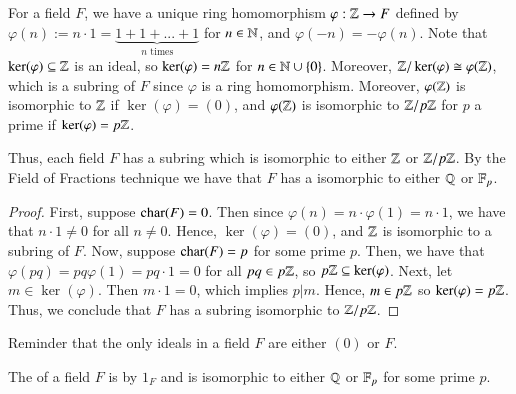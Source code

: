 \begin{rmk}
    For a field $F$, we have a unique ring homomorphism $\varphi:\mathbb Z\rightarrow F$ defined by $\varphi(n) := n\cdot 1 = \underbrace{1+1+...+1}_{\text{$n$ times}}$ for $n \in \mathbb N$, and $\varphi(-n) = -\varphi(n)$. Note that $\ker(\varphi) \subseteq \mathbb Z$ is an ideal, so $\ker(\varphi) = n\mathbb Z$ for $n \in \mathbb N\cup \{0\}$. Moreover, $\mathbb Z/\ker(\varphi) \cong \varphi(\mathbb Z)$, which is a subring of $F$ since $\varphi$ is a ring homomorphism. Moreover, $\varphi(\mathbb Z)$ is isomorphic to $\mathbb Z$ if $\ker(\varphi) = (0)$, and $\varphi(\mathbb Z)$ is isomorphic to $\mathbb Z/p\mathbb Z$ for $p$ a prime if $\ker(\varphi) = p\mathbb Z$. 

    Thus, each field $F$ has a subring which is isomorphic to either $\mathbb Z$ or $\mathbb Z/p\mathbb Z$. By the Field of Fractions technique we have that $F$ has a  isomorphic to either $\mathbb Q$ or $\mathbb F_p$.
\end{rmk}
\begin{proof}
    First, suppose $\operatorname{char}(F) = 0$. Then since $\varphi(n) = n\cdot \varphi(1) = n\cdot 1$, we have that $n\cdot 1 \neq 0$ for all $n \neq 0$. Hence, $\ker(\varphi) = (0)$, and $\mathbb Z$ is isomorphic to a subring of $F$. Now, suppose $\operatorname{char}(F) = p$ for some prime $p$. Then, we have that $\varphi(pq) = pq\varphi(1) = pq\cdot1 = 0$ for all $pq \in p\mathbb Z$, so $p\mathbb Z \subseteq \ker(\varphi)$. Next, let $m \in \ker(\varphi)$. Then $m\cdot 1 = 0$, which implies $p\vert m$. Hence, $m \in p\mathbb Z$ so $\ker(\varphi) = p\mathbb Z$. Thus, we conclude that $F$ has a subring isomorphic to $\mathbb Z/p\mathbb Z$.
\end{proof}


\begin{rec}
    Reminder that the only ideals in a field $F$ are either $(0)$ or $F$.
\end{rec}


\begin{defn}
    The  of a field $F$ is  by $1_F$ and is isomorphic to either $\mathbb Q$ or $\mathbb F_p$ for some prime $p$.
\end{defn}
